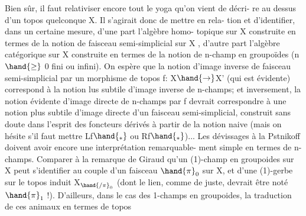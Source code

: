  Bien sûr, il faut relativiser encore tout le yoga qu'on vient de décri-%
re\hand{,} au dessus d'un topos quelconque X. Il s'agirait donc de mettre en rela-%
tion et d'identifier, dans un certaine mesure, d'une part l'algèbre homo-%
topique sur X construite en termes de la notion de faisceau semi-simplicial
sur X , d'autre part l'algèbre catégorique sur X construite en termes de
la notion de n-champ en groupoïdes (n $\hand{\geq}$ 0 fini ou infini). On espère que
la notion d'image inverse de faisceau semi-simplicial par un morphisme de
topos f: X$\hand{\to}$X' (qui est évidente)  correspond à la notion lus
subtile d'image inverse de n-champs; et inversement,  la notion évidente
d'image directe de n-champs par f devrait correspondre à une notion plus
subtile d'image directe  d'un faisceau semi-simplicial, construit sans doute
dans l'esprit des foncteurs dérivés à partir de la notion naive (mais on
hésite s'il faut mettre Lf$\hand{_*}$ ou Rf$\hand{_*}$)... Les dévissages à la Pstnikoff
 doivent avoir encore une interprétation remarquable-%
ment simple en termes de n-champs. Comparer à la remarque de Giraud qu'un
(1)-champ en groupoides sur X peut s'identifier au couple d'un faisceau
$\hand{\pi}_0$ sur X, et d'une (1)-gerbe sur le topos induit X$_{\hand{/\pi}_0}$ (dont le lien,
comme de juste, devrait être noté $\hand{\pi}_1$ !). D'ailleurs, dans le cas des
1-champs en groupoides, la traduction de ces animaux en termes de topos

